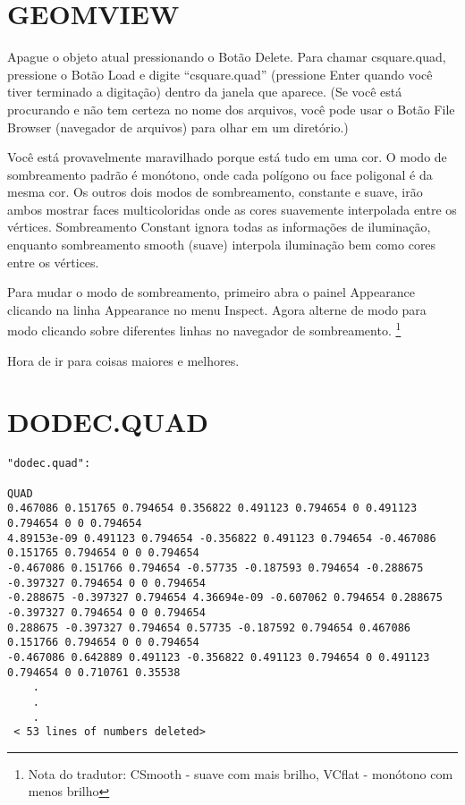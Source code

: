 \documentclass[12pt,a4paper]{book}
\begin{document}
\section{GEOMVIEW}

Apague o objeto atual pressionando o Bot\~ao Delete.  Para
chamar csquare.quad, pressione o Bot\~ao Load e digite ``csquare.quad'' (pressione
Enter quando voc\^e tiver terminado a digita\c{c}\~ao) dentro da janela que aparece. (Se
voc\^e est\'a procurando e n\~ao tem certeza no nome dos arquivos, voc\^e pode usar o
Bot\~ao File Browser (navegador de arquivos) para olhar em um diret\'{o}rio.)

Voc\^e est\'a provavelmente maravilhado porque est\'a tudo em uma cor.  O modo de sombreamento
padrão é monótono, onde cada polígono ou face poligonal é da mesma
cor. Os outros dois modos de sombreamento, constante e suave, irão ambos
mostrar faces multicoloridas onde as cores suavemente interpolada
entre os vértices. Sombreamento Constant ignora todas as informações de iluminação,
enquanto sombreamento smooth (suave) interpola iluminação bem como cores entre
os vértices.

Para mudar o modo de sombreamento, primeiro abra o painel Appearance clicando
na linha Appearance no menu Inspect.  Agora alterne de
modo para modo clicando sobre diferentes linhas no navegador de sombreamento.
\footnote{Nota do tradutor: CSmooth - suave com mais brilho, VCflat - monótono com menos brilho}

Hora de ir para coisas maiores e melhores. 

\section{DODEC.QUAD}

\tiny
\begin{verbatim}
"dodec.quad":

QUAD
0.467086 0.151765 0.794654 0.356822 0.491123 0.794654 0 0.491123 0.794654 0 0 0.794654
4.89153e-09 0.491123 0.794654 -0.356822 0.491123 0.794654 -0.467086 0.151765 0.794654 0 0 0.794654
-0.467086 0.151766 0.794654 -0.57735 -0.187593 0.794654 -0.288675 -0.397327 0.794654 0 0 0.794654
-0.288675 -0.397327 0.794654 4.36694e-09 -0.607062 0.794654 0.288675 -0.397327 0.794654 0 0 0.794654
0.288675 -0.397327 0.794654 0.57735 -0.187592 0.794654 0.467086 0.151766 0.794654 0 0 0.794654
-0.467086 0.642889 0.491123 -0.356822 0.491123 0.794654 0 0.491123 0.794654 0 0.710761 0.35538
	.
	.
	.
 < 53 lines of numbers deleted>
\end{verbatim}
\normalsize
\end{document}
